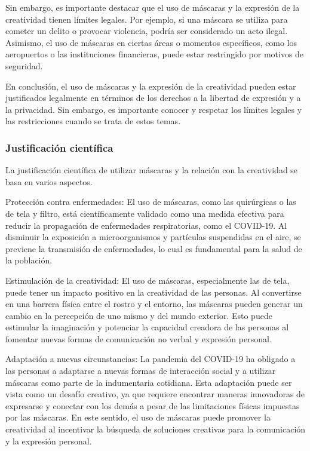 \documentclass[12pt,a4paper]{article}
\begin{document}
Sin embargo, es importante destacar que el uso de máscaras y la expresión de la creatividad tienen límites legales. Por ejemplo, si una máscara se utiliza para cometer un delito o provocar violencia, podría ser considerado un acto ilegal. Asimismo, el uso de máscaras en ciertas áreas o momentos específicos, como los aeropuertos o las instituciones financieras, puede estar restringido por motivos de seguridad.

En conclusión, el uso de máscaras y la expresión de la creatividad pueden estar justificados legalmente en términos de los derechos a la libertad de expresión y a la privacidad. Sin embargo, es importante conocer y respetar los límites legales y las restricciones cuando se trata de estos temas.
\subsubsection{Justificación científica}
La justificación científica de utilizar máscaras y la relación con la creatividad se basa en varios aspectos.

Protección contra enfermedades: El uso de máscaras, como las quirúrgicas o las de tela y filtro, está científicamente validado como una medida efectiva para reducir la propagación de enfermedades respiratorias, como el COVID-19. Al disminuir la exposición a microorganismos y partículas suspendidas en el aire, se previene la transmisión de enfermedades, lo cual es fundamental para la salud de la población.

Estimulación de la creatividad: El uso de máscaras, especialmente las de tela, puede tener un impacto positivo en la creatividad de las personas. Al convertirse en una barrera física entre el rostro y el entorno, las máscaras pueden generar un cambio en la percepción de uno mismo y del mundo exterior. Esto puede estimular la imaginación y potenciar la capacidad creadora de las personas al fomentar nuevas formas de comunicación no verbal y expresión personal.

Adaptación a nuevas circunstancias: La pandemia del COVID-19 ha obligado a las personas a adaptarse a nuevas formas de interacción social y a utilizar máscaras como parte de la indumentaria cotidiana. Esta adaptación puede ser vista como un desafío creativo, ya que requiere encontrar maneras innovadoras de expresarse y conectar con los demás a pesar de las limitaciones físicas impuestas por las máscaras. En este sentido, el uso de máscaras puede promover la creatividad al incentivar la búsqueda de soluciones creativas para la comunicación y la expresión personal.
\end{document}
